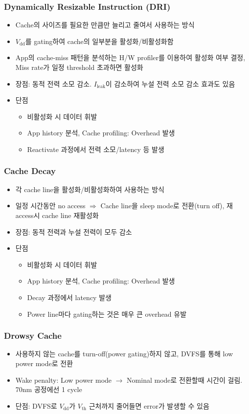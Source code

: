\subsubsection*{Dynamically Resizable Instruction (DRI)}
\begin{itemize}
    \item Cache의 사이즈를 필요한 만큼만 늘리고 줄여서 사용하는 방식
    \item $V_{\mathrm{dd}}$를 gating하여 cache의 일부분을 활성화/비활성화함
    \item App의 cache-miss 패턴을 분석하는 H/W profiler를 이용하여 활성화 여부 결정, Miss rate가 일정 threshold 초과하면 활성화
    \item 장점: 동적 전력 소모 감소. $I_{\mathrm{leak}}$이 감소하여 누설 전력 소모 감소 효과도 있음
    \item 단점
    \begin{itemize}
        \item 비활성화 시 데이터 휘발
        \item App history 분석, Cache profiling: Overhead 발생
        \item Reactivate 과정에서 전력 소모/latency 등 발생
    \end{itemize}
\end{itemize}

\subsubsection*{Cache Decay}
\begin{itemize}
    \item 각 cache line을 활성화/비활성화하여 사용하는 방식
    \item 일정 시간동안 no access $\Rightarrow$ Cache line을 sleep mode로 전환(turn off), 재access시 cache line 재활성화
    \item 장점: 동적 전력과 누설 전력이 모두 감소
    \item 단점
    \begin{itemize}
        \item 비활성화 시 데이터 휘발
        \item App history 분석, Cache profiling: Overhead 발생
        \item Decay 과정에서 latency 발생
        \item Power line마다 gating하는 것은 매우 큰 overhead 유발
    \end{itemize}
\end{itemize}

\subsubsection*{Drowsy Cache}
\begin{itemize}
    \item 사용하지 않는 cache를 turn-off(power gating)하지 않고, DVFS를 통해 low power mode로 전환
    \item Wake penalty: Low power mode $\rightarrow$ Nominal mode로 전환할때 시간이 걸림. 70nm 공정에선 1 cycle
    \item 단점: DVFS로 $V_{\mathrm{dd}}$가 $V_{\mathrm{th}}$ 근처까지 줄어들면 error가 발생할 수 있음
\end{itemize}

